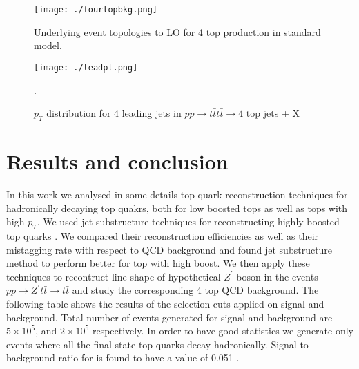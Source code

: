 \documentclass[12pt,a4paper]{article}		%
\begin{document}
\begin{figure}[h]
	\begin{centering}	
		\texttt{[image: ./fourtopbkg.png]} 
		\caption{ Underlying event topologies to LO for 4 top production in standard model. }
		\label{topbkg}
		\centering
	\end{centering} 		
\end{figure} 

\newpage
\begin{figure}[h]
	\begin{centering}	
		\texttt{[image: ./leadpt.png]} 
		\caption{ $p_T$ distribution for 4 leading jets in $pp \to t \bar{t} t \bar{t}  \to 4 $ top jets + X} \cite{top4}. 
		\label{top4pt}
		\centering
	\end{centering} 		
\end{figure} 
  
\section{Results and conclusion}

In this work we analysed in some details top quark reconstruction techniques for hadronically decaying top quakrs, both for low boosted tops as well as tops with high $p_T$. We used jet substructure techniques for reconstructing highly boosted top quarks . We compared their reconstruction efficiencies as well as their mistagging rate with respect to QCD background and found jet substructure method to perform better for top with high boost. We then apply these techniques to recontruct line shape of hypothetical $Z^\prime$ boson in the events $pp \to Z^\prime t \bar{t} \to t \bar{t} $ and study the corresponding 4 top QCD background. The following table shows the results of the selection cuts applied on signal and background. Total number of events generated for signal and background are $5 \times 10^5$, and $2 \times 10^5$ respectively. In order to have good statistics we generate only events where all the final state top quarks decay hadronically. Signal to background ratio for is found to have a value of 0.051 .     
\end{document}
